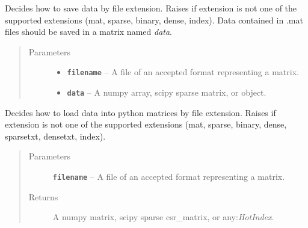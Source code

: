 \documentclass[letterpaper,10pt,english]{sphinxmanual}
\begin{document}

\begin{fulllineitems}
\label{loader:loader.export_data}
Decides how to save data by file extension.
Raises {\hyperref[loader:loader.Unsupported_format_error]{\emph{}}} if extension is not one of the supported
extensions (mat, sparse, binary, dense, index).
Data contained in .mat files should be saved in a matrix named \emph{data}.
\begin{quote}\begin{description}
\item[{Parameters}] \leavevmode\begin{itemize}
\item {} 
\textbf{\texttt{filename}} -- A file of an accepted format representing a matrix.

\item {} 
\textbf{\texttt{data}} -- A numpy array, scipy sparse matrix, or {\hyperref[loader:loader.HotIndex]{\emph{}}} object.

\end{itemize}

\end{description}\end{quote}

\end{fulllineitems}


\begin{fulllineitems}
\label{loader:loader.import_data}
Decides how to load data into python matrices by file extension.
Raises {\hyperref[loader:loader.Unsupported_format_error]{\emph{}}} if extension is not one of the supported
extensions (mat, sparse, binary, dense, sparsetxt, densetxt, index).
\begin{quote}\begin{description}
\item[{Parameters}] \leavevmode
\textbf{\texttt{filename}} -- A file of an accepted format representing a matrix.

\item[{Returns}] \leavevmode
A numpy matrix, scipy sparse csr\_matrix, or any:\emph{HotIndex}.

\end{description}\end{quote}

\end{fulllineitems}
\end{document}

